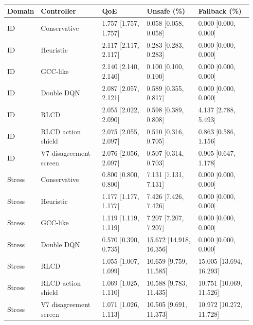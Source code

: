 \begin{tabular}{lllll}
\toprule
Domain & Controller & QoE & Unsafe (\%) & Fallback (\%) \\
\midrule
ID & Conservative & 1.757 [1.757, 1.757] & 0.058 [0.058, 0.058] & 0.000 [0.000, 0.000] \\
ID & Heuristic & 2.117 [2.117, 2.117] & 0.283 [0.283, 0.283] & 0.000 [0.000, 0.000] \\
ID & GCC-like & 2.140 [2.140, 2.140] & 0.100 [0.100, 0.100] & 0.000 [0.000, 0.000] \\
ID & Double DQN & 2.087 [2.057, 2.121] & 0.589 [0.355, 0.817] & 0.000 [0.000, 0.000] \\
ID & RLCD & 2.055 [2.022, 2.090] & 0.598 [0.389, 0.808] & 4.137 [2.788, 5.493] \\
ID & RLCD action shield & 2.075 [2.055, 2.097] & 0.510 [0.316, 0.705] & 0.863 [0.586, 1.156] \\
ID & V7 disagreement screen & 2.076 [2.056, 2.097] & 0.507 [0.314, 0.703] & 0.905 [0.647, 1.178] \\
Stress & Conservative & 0.800 [0.800, 0.800] & 7.131 [7.131, 7.131] & 0.000 [0.000, 0.000] \\
Stress & Heuristic & 1.177 [1.177, 1.177] & 7.426 [7.426, 7.426] & 0.000 [0.000, 0.000] \\
Stress & GCC-like & 1.119 [1.119, 1.119] & 7.207 [7.207, 7.207] & 0.000 [0.000, 0.000] \\
Stress & Double DQN & 0.570 [0.390, 0.735] & 15.672 [14.918, 16.356] & 0.000 [0.000, 0.000] \\
Stress & RLCD & 1.055 [1.007, 1.099] & 10.659 [9.759, 11.585] & 15.005 [13.694, 16.293] \\
Stress & RLCD action shield & 1.069 [1.025, 1.110] & 10.588 [9.783, 11.435] & 10.751 [10.069, 11.526] \\
Stress & V7 disagreement screen & 1.071 [1.026, 1.113] & 10.505 [9.691, 11.373] & 10.972 [10.272, 11.728] \\
\bottomrule
\end{tabular}
